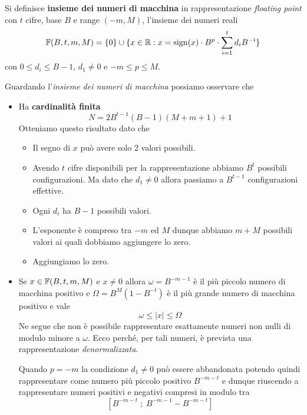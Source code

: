 \begin{definition}\label{def: numeri_macchina}
	Si definisce \textbf{insieme dei numeri di macchina} in rappresentazione \emph{floating point} con $t$
	cifre, base $B$ e range $(-m, M)$, l'insieme dei numeri reali
	\[
		\mathbb{F} (B, t, m, M) = \{ 0 \} \cup
		\{ x \in \mathbb{R} : x = \operatorname{sign}(x) \cdot B^p \cdot \sum_{i=1}^t d_i B^{-i} \}
	\]
	con $0 \leq d_i \leq B-1$, $d_1 \neq 0$ e $-m \leq p \leq M$.
\end{definition}

\begin{observation}
	Guardando l'\emph{insieme dei numeri di macchina} possiamo osservare che
	\begin{itemize}
		\item Ha \textbf{cardinalità finita}
		      \[ N = 2 B^{t-1} (B - 1) (M + m + 1) + 1 \]
		      Otteniamo questo risultato dato che
		      \begin{itemize}
			      \item Il segno di $x$ può avere solo 2 valori possibili.
			      \item Avendo $t$ cifre disponibili per la rappresentazione abbiamo $B^t$ possibili
			            configurazioni. Ma dato che $d_1 \neq 0$ allora passiamo a $B^{t-1}$ configurazioni
			            effettive.
			      \item Ogni $d_i$ ha $B - 1$ possibili valori.
			      \item L'esponente è compreso tra $-m$ ed $M$ dunque abbiamo $m + M$ possibili valori ai quali
			            dobbiamo aggiungere lo zero.
			      \item Aggiungiamo lo zero.
		      \end{itemize}
		\item Se $x \in \mathbb{F}(B, t, m, M)$ e $x \neq 0$ allora $\omega = B^{-m - 1}$ è il più piccolo numero di
		      macchina positivo e $\Omega = B^M (1 - B^{-t})$ è il più grande numero di macchina positivo e
		      vale
		      \[ \omega \leq |x| \leq \Omega \]
		      Ne segue che non è possibile rappresentare esattamente numeri non nulli di modulo minore a
		      $\omega$. Ecco perché, per tali numeri, è prevista una rappresentazione \emph{denormalizzata}.

		      Quando $p = -m$ la condizione $d_1 \neq 0$ può essere abbandonata potendo quindi rappresentare
		      come numero più piccolo positivo $B^{-m-t}$ e dunque riuscendo a rappresentare numeri positivi
		      e negativi compresi in modulo tra
		      \[ [ B^{-m-t} \;;\; B^{-m-1} - B^{-m-t} ] \]


\end{itemize}
\end{observation}
